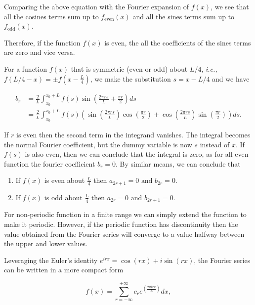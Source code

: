 \documentclass[english,a4paper,12pt]{report}
\begin{document}
Comparing the above equation with the Fourier expansion of \(f(x)\), we see that all the cosines terms sum up to \(f_{\text{even}}(x)\) and all the sines terms sum up to \(f_{\text{odd} }(x)\). 

Therefore, if the function \(f(x)\) is even, the all the coefficients of the sines terms are zero and vice versa. 

For a function \(f(x)\) that is symmetric (even or odd) about \(L /4 \), \textit{i.e.,} \(f(L /4-x ) = \pm f(x - \frac{L}{4} )\), we make the substitution \(s = x-L /4 \) and we have 

\begin{equation}
    \begin{aligned} 
    b_{r} &= \frac{2}{L} \int_{x_0 }^{x_0 + L} f(s) \sin \left( \frac{2 \pi rs}{L} + \frac{\pi r}{2} \right) ds \\ &= \frac{2}{L} \int_{x_0 }^{x_0 + L} f(s) \left( \sin \left( \frac{2 \pi  rs}{L}  \right) \cos \left( \frac{\pi r}{2}  \right) + \cos \left( \frac{2 \pi rs}{L}  \right) \sin \left( \frac{\pi r}{2} \right)\right) ds.        
    \end{aligned} 
\end{equation}

If \(r\) is even then the second term in the integrand vanishes. The integral becomes the normal Fourier coefficient, but the dummy variable is now \(s\) instead of \(x\). If \(f(s)\) is also even, then we can conclude that the integral is zero, as for all even function the fourier coefficient \(b_{r} = 0\). By similar means, we can conclude that 

\begin{enumerate}
    \item If \(f(x)\) is even about \(\frac{L}{4} \) then \(a_{2r+1} = 0 \text { and } b_{2r} = 0 \).
    \item If \(f(x)\) is odd about \(\frac{L}{4} \) then \(a_{2r} = 0 \text { and } b_{2r+1} = 0 \).      
\end{enumerate}

For non-periodic function in a finite range we can simply extend the function to make it periodic. However, if the periodic function has discontinuity then the value obtained from the Fourier series will converge to a value halfway between the upper and lower values.

Leveraging the Euler's identity \(e^{irx} = \cos (rx) + i\sin (rx) \), the Fourier series can be written in a more compact form

\begin{equation}
    f(x) = \sum_{r=-\infty}^{+\infty} c_{r} e^{\left( \frac{2\pi i rx}{L}  \right)}dx,  
\end{equation}
\end{document}
